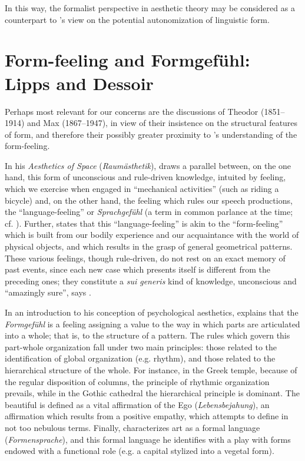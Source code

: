 \documentclass[output=paper]{langscibook}
\begin{document}
In this way, the formalist perspective in aesthetic theory may be considered as a counterpart to {\Sapir}'s view on the potential autonomization of linguistic form.

\section{Form-feeling and Formgefühl: Lipps and Dessoir}
\label{sec:fortis:lippsdessoir}

Perhaps most relevant for our concerns are the discussions of Theodor {\Lipps} (1851--1914) and Max {\Dessoir} (1867--1947), in view of their insistence on the structural features of form, and therefore their possibly greater proximity to {\Sapir}'s understanding of the form-feeling.

In his \emph{Aesthetics of Space} (\emph{Raumästhetik}), \citet{Lipps1897} draws a parallel between, on the one hand, this form of unconscious and rule-driven knowledge, intuited by feeling, which we exercise when engaged in ``mechanical activities'' (such as riding a bicycle) and, on the other hand, the feeling which rules our speech productions, the ``language-feeling'' or \emph{Sprachgefühl} (a term in common parlance at the time; cf. \citealt{Tchougounnikov}). Further, \citet[chap. 8]{Lipps1897} states that this ``language-feeling'' is akin to the ``form-feeling'' which is built from our bodily experience and our acquaintance with the world of physical objects, and which results in the grasp of general geometrical patterns. These various feelings, though rule-driven, do not rest on an exact memory of past events, since each new case which presents itself is different from the preceding ones; they constitute a \emph{sui generis} kind of knowledge, unconscious and ``amazingly sure'', says {\Lipps}.

In an introduction to his conception of psychological aesthetics, \citet{Lipps1907} explains that the \emph{Formgefühl} is a feeling assigning a value to the way in which parts are articulated into a whole; that is, to the structure of a pattern. The rules which govern this part-whole organization fall under two main principles: those related to the identification of global organization (e.g. rhythm), and those related to the hierarchical structure of the whole. For instance, in the Greek temple, because of the regular disposition of columns, the principle of rhythmic organization prevails, while in the Gothic cathedral the hierarchical principle is dominant. The beautiful is defined as a vital affirmation of the Ego (\emph{Lebensbejahung}), an affirmation which results from a positive empathy, which {\Lipps} attempts to define in not too nebulous terms. Finally, {\Lipps} characterizes art as a formal language (\emph{Formensprache}), and this formal language he identifies with a play with forms endowed with a functional role (e.g. a capital stylized into a vegetal form).
\end{document}
